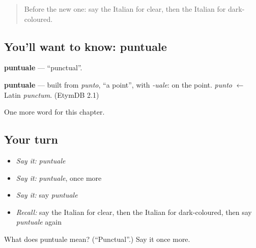 \begin{quote}
Before the new one: say the Italian for clear, then the Italian for dark-coloured.
\end{quote}

\subsection*{You'll want to know: puntuale}
\textbf{puntuale} — \textquotedblleft{}punctual\textquotedblright{}.

\begin{cousinweb}
\textbf{puntuale} — built from \emph{punto}, \textquotedblleft{}a point\textquotedblright{}, with \emph{-uale}: on the point. \emph{punto} $\leftarrow$ Latin \emph{punctum}. (EtymDB 2.1)
\end{cousinweb}

\begin{grammarlens}[title={What you've built}]
One more word for this chapter.
\end{grammarlens}

\subsection*{Your turn}
\begin{itemize}
\raggedright
  \item \emph{Say it:} \emph{puntuale}
  \item \emph{Say it:} \emph{puntuale}, once more
  \item \emph{Say it:} say \emph{puntuale}
  \item \emph{Recall:} say the Italian for clear, then the Italian for dark-coloured, then say \emph{puntuale} again
\end{itemize}

\begin{tcolorbox}[breakable,colback=teal!4,colframe=teal!35!black,title={Before you move on}]
What does puntuale mean? (\textquotedblleft{}Punctual\textquotedblright{}.) Say it once more.
\end{tcolorbox}
